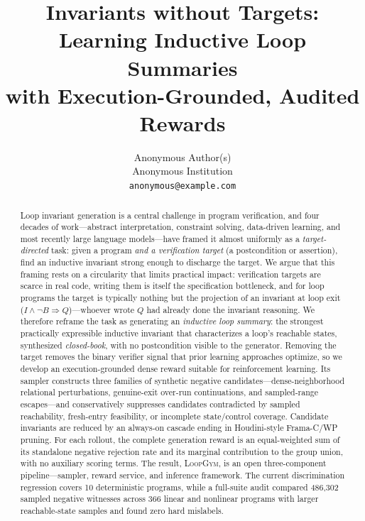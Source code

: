 \documentclass[11pt]{article}
\title{Invariants without Targets: Learning Inductive Loop Summaries\\with Execution-Grounded, Audited Rewards}
\author{
  Anonymous Author(s)\\
  Anonymous Institution\\
  \texttt{anonymous@example.com}
}
\newcommand{\sam}{\textsc{LoopGym}}
\begin{document}
\maketitle

\begin{abstract}
Loop invariant generation is a central challenge in program verification, and four decades of work---abstract interpretation, constraint solving, data-driven learning, and most recently large language models---have framed it almost uniformly as a \emph{target-directed} task: given a program \emph{and a verification target} (a postcondition or assertion), find an inductive invariant strong enough to discharge the target.
We argue that this framing rests on a circularity that limits practical impact: verification targets are scarce in real code, writing them is itself the specification bottleneck, and for loop programs the target is typically nothing but the projection of an invariant at loop exit ($I \wedge \neg B \Rightarrow Q$)---whoever wrote $Q$ had already done the invariant reasoning.
We therefore reframe the task as generating an \emph{inductive loop summary}: the strongest practically expressible inductive invariant that characterizes a loop's reachable states, synthesized \emph{closed-book}, with no postcondition visible to the generator.
Removing the target removes the binary verifier signal that prior learning approaches optimize, so we develop an execution-grounded dense reward suitable for reinforcement learning.  Its sampler constructs three families of synthetic negative candidates---dense-neighborhood relational perturbations, genuine-exit over-run continuations, and sampled-range escapes---and conservatively suppresses candidates contradicted by sampled reachability, fresh-entry feasibility, or incomplete state/control coverage.
Candidate invariants are reduced by an always-on cascade ending in Houdini-style Frama-C/WP pruning.  For each rollout, the complete generation reward is an equal-weighted sum of its standalone negative rejection rate and its marginal contribution to the group union, with no auxiliary scoring terms.
The result, \sam{}, is an open three-component pipeline---sampler, reward service, and inference framework.  The current discrimination regression covers 10 deterministic programs, while a full-suite audit compared 486,302 sampled negative witnesses across 366 linear and nonlinear programs with larger reachable-state samples and found zero hard mislabels.
\end{abstract}











\newpage
\appendix

\end{document}
